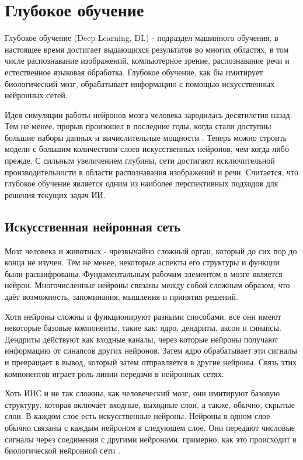 \section{Глубокое обучение} \label{ch1:dl}

Глубокое обучение (Deep Learning, DL) - подраздел машинного обучения, в настоящее время достигает выдающихся результатов во многих областях, в том числе распознавание изображений, компьютерное зрение, распознавание речи и естественное языковая обработка. Глубокое обучение, как бы имитирует биологический мозг, обрабатывает информацию с помощью искусственных нейронных сетей.

Идея симуляции работы нейронов мозга человека зародилась десятилетия назад. Тем не менее, прорыв произошел в последние годы, когда стали доступны большие наборы данных и вычислительные мощности \cite{10.1145/2771283}. Теперь можно строить модели с большим количеством слоев искусственных нейронов, чем когда-либо прежде. С сильным увеличением глубины, сети достигают исключительной производительности в области распознавания изображений и речи. Считается, что глубокое обучение является одним из наиболее перспективных подходов для решения текущих задач ИИ.

\subsection{Искусственная нейронная сеть}

Мозг человека и животных - чрезвычайно сложный орган, который до сих пор до конца не изучен. Тем не менее, некоторые аспекты его структуры и функции были расшифрованы. Фундаментальным рабочим элементом в мозге является нейрон. Многочисленные нейроны связаны между собой сложным образом, что даёт возможность, запоминания, мышления и принятия решений. 

Хотя нейроны сложны и функционируют разными способами, все они имеют некоторые базовые компоненты, такие как: ядро, дендриты, аксон и синапсы. Дендриты действуют как входные каналы, через которые нейроны получают информацию от синапсов других нейронов. Затем ядро обрабатывает эти сигналы и превращает в вывод, который затем отправляется в другие нейроны. Связь этих компонентов играет роль линии передачи в нейронных сетях.

Хоть ИНС и не так сложны, как человеческий мозг, они имитируют базовую структуру, которая включает входные, выходные слои, а также, обычно, скрытые слои. В каждом слое есть искусственные нейроны. Нейроны в одном слое обычно связаны с каждым нейроном в следующем слое. Они передают числовые сигналы через соединения с другими нейронами, примерно, как это происходит в биологической нейронной сети \cite{296402}.

